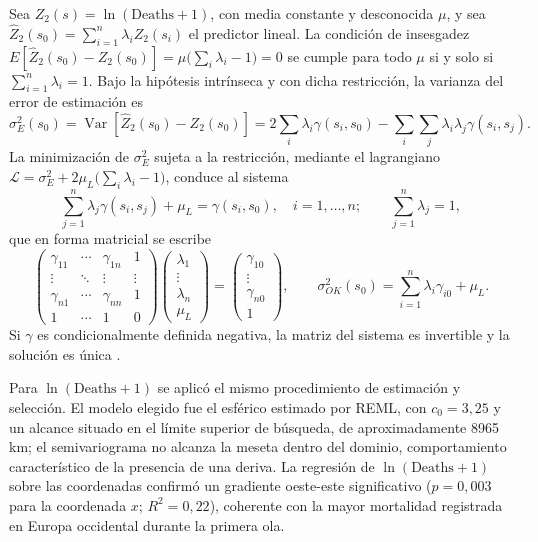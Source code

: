 \documentclass[12pt,a4paper]{article}
\newcommand{\lnD}{\ln(\text{Deaths}+1)}
\begin{document}
Sea $Z_2(s)=\lnD$, con media constante y desconocida $\mu$, y sea $\hat Z_2(s_0)=\sum_{i=1}^n\lambda_iZ_2(s_i)$ el predictor lineal. La condición de insesgadez $E[\hat Z_2(s_0)-Z_2(s_0)]=\mu\big(\sum_i\lambda_i-1\big)=0$ se cumple para todo $\mu$ si y solo si $\sum_{i=1}^n\lambda_i=1$. Bajo la hipótesis intrínseca y con dicha restricción, la varianza del error de estimación es
\[
\sigma_E^2(s_0)=\operatorname{Var}[\hat Z_2(s_0)-Z_2(s_0)]=2\sum_{i}\lambda_i\gamma(s_i,s_0)-\sum_{i}\sum_{j}\lambda_i\lambda_j\gamma(s_i,s_j).
\]
La minimización de $\sigma_E^2$ sujeta a la restricción, mediante el lagrangiano $\mathcal L=\sigma_E^2+2\mu_L\big(\sum_i\lambda_i-1\big)$, conduce al sistema
\[
\sum_{j=1}^n\lambda_j\gamma(s_i,s_j)+\mu_L=\gamma(s_i,s_0),\quad i=1,\dots,n;\qquad\sum_{j=1}^n\lambda_j=1,
\]
que en forma matricial se escribe
\[
\begin{pmatrix}\gamma_{11}&\cdots&\gamma_{1n}&1\\\vdots&\ddots&\vdots&\vdots\\\gamma_{n1}&\cdots&\gamma_{nn}&1\\1&\cdots&1&0\end{pmatrix}
\begin{pmatrix}\lambda_1\\\vdots\\\lambda_n\\\mu_L\end{pmatrix}=
\begin{pmatrix}\gamma_{10}\\\vdots\\\gamma_{n0}\\1\end{pmatrix},\qquad
\sigma^2_{OK}(s_0)=\sum_{i=1}^n\lambda_i\gamma_{i0}+\mu_L.
\]
Si $\gamma$ es condicionalmente definida negativa, la matriz del sistema es invertible y la solución es única \citep{cressie1993}.

Para $\lnD$ se aplicó el mismo procedimiento de estimación y selección. El modelo elegido fue el esférico estimado por REML, con $c_0=3{,}25$ y un alcance situado en el límite superior de búsqueda, de aproximadamente 8965\,km; el semivariograma no alcanza la meseta dentro del dominio, comportamiento característico de la presencia de una deriva. La regresión de $\lnD$ sobre las coordenadas confirmó un gradiente oeste-este significativo ($p=0{,}003$ para la coordenada $x$; $R^2=0{,}22$), coherente con la mayor mortalidad registrada en Europa occidental durante la primera ola.
\end{document}
